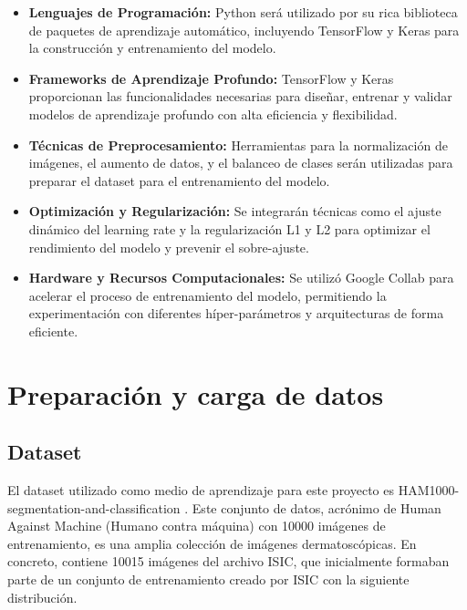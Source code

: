 \begin{itemize}
    \item \textbf{Lenguajes de Programación:} Python será utilizado por su rica biblioteca de paquetes de aprendizaje automático, incluyendo TensorFlow y Keras para la construcción y entrenamiento del modelo.
    \item \textbf{Frameworks de Aprendizaje Profundo:} TensorFlow y Keras proporcionan las funcionalidades necesarias para diseñar, entrenar y validar modelos de aprendizaje profundo con alta eficiencia y flexibilidad.
    \item \textbf{Técnicas de Preprocesamiento:} Herramientas para la normalización de imágenes, el aumento de datos, y el balanceo de clases serán utilizadas para preparar el dataset para el entrenamiento del modelo.
    \item \textbf{Optimización y Regularización:} Se integrarán técnicas como el ajuste dinámico del learning rate y la regularización L1 y L2 para optimizar el rendimiento del modelo y prevenir el sobre-ajuste.
    \item \textbf{Hardware y Recursos Computacionales:} Se utilizó Google Collab para acelerar el proceso de entrenamiento del modelo, permitiendo la experimentación con diferentes híper-parámetros y arquitecturas de forma eficiente.
\end{itemize}


\section{Preparación y carga de datos}

\subsection{Dataset}

El dataset utilizado como medio de aprendizaje para este proyecto es HAM1000-segmentation-and-classification . Este conjunto de datos, acrónimo de Human Against Machine (Humano contra máquina) con 10000 imágenes de entrenamiento, es una amplia colección de imágenes dermatoscópicas. En concreto, contiene 10015 imágenes del archivo ISIC, que inicialmente formaban parte de un conjunto de entrenamiento creado por ISIC  con la siguiente distribución.

